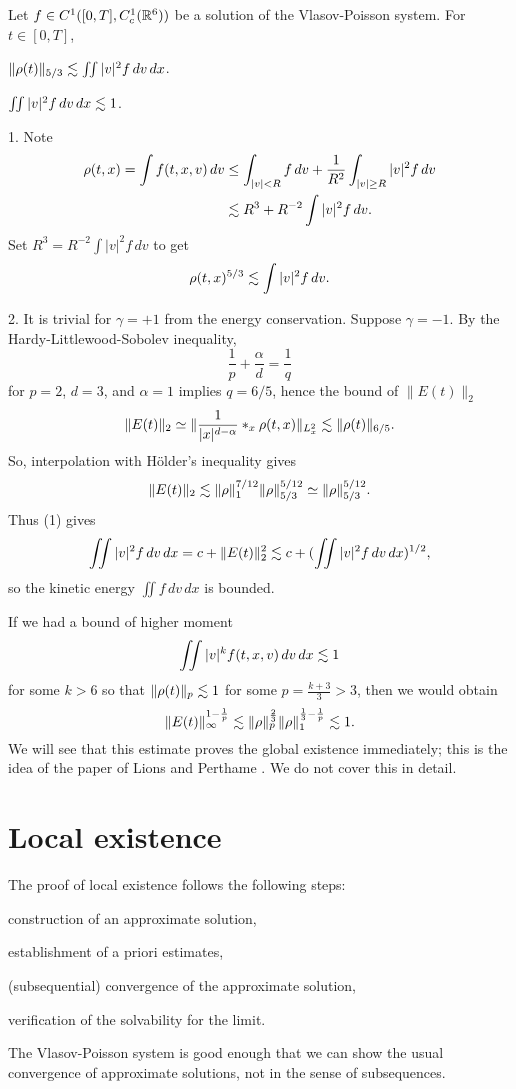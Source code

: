 \documentclass[11pt]{amsart}
\begin{document}
\begin{lem}
Let $f\in C^1([0,T],C_c^1(\mathbb{R}^6))$ be a solution of the Vlasov-Poisson system.
For $t\in[0,T]$,
\begin{ol}
\item $\|\rho(t)\|_{5/3}\lesssim\iint|v|^2f\,dv\,dx$.
\item $\iint|v|^2f\,dv\,dx\lesssim1$.
\end{ol}
\end{lem}
\begin{pf}
1.
Note
\begin{align*}
\rho(t,x)=\int f(t,x,v)\,dv
&\le\int_{|v|<R}f\,dv+\frac1{R^2}\int_{|v|\ge R}|v|^2f\,dv\\
&\lesssim R^3+ R^{-2}\int|v|^2f\,dv.
\end{align*}
Set $R^3=R^{-2}\int|v|^2f\,dv$ to get
\[\rho(t,x)^{5/3}\lesssim\int|v|^2f\,dv.\]

2.
It is trivial for $\gamma=+1$ from the energy conservation.
Suppose $\gamma=-1$.
By the Hardy-Littlewood-Sobolev inequality,
\[\frac1p+\frac\alpha d=\frac1q\]
for $p=2$, $d=3$, and $\alpha=1$ implies $q=6/5$, hence the bound of $\|E(t)\|_2$
\[\|E(t)\|_2\simeq\|\frac1{|x|^{d-\alpha}}*_x\rho(t,x)\|_{L_x^2}\lesssim\|\rho(t)\|_{6/5}.\]
So, interpolation with H\"older's inequality gives
\[\|E(t)\|_2\lesssim\|\rho\|_1^{7/12}\|\rho\|_{5/3}^{5/12}\simeq\|\rho\|_{5/3}^{5/12}.\]
Thus (1) gives
\[\iint|v|^2f\,dv\,dx=c+\|E(t)\|_2^2\lesssim c+(\iint|v|^2f\,dv\,dx)^{1/2},\]
so the kinetic energy $\iint f\,dv\,dx$ is bounded.\qedhere
\end{pf}

\begin{rmk}
If we had a bound of higher moment
\[\iint|v|^kf(t,x,v)\,dv\,dx\lesssim1\]
for some $k>6$ so that $\|\rho(t)\|_p\lesssim1$ for some $p=\frac{k+3}3>3$, then we would obtain
\[\|E(t)\|_\infty^{1-\frac1p}\lesssim\|\rho\|_p^{\frac23}\|\rho\|_1^{\frac13-\frac1p}\lesssim1.\]
We will see that this estimate proves the global existence immediately; this is the idea of the paper of Lions and Perthame \cite{lions1991propagation}.
We do not cover this in detail.
\end{rmk}




\section{Local existence}

The proof of local existence follows the following steps:
\begin{ol}
\item construction of an approximate solution,
\item establishment of a priori estimates,
\item (subsequential) convergence of the approximate solution,
\item verification of the solvability for the limit.
\end{ol}
The Vlasov-Poisson system is good enough that we can show the usual convergence of approximate solutions, not in the sense of subsequences.
\end{document}
